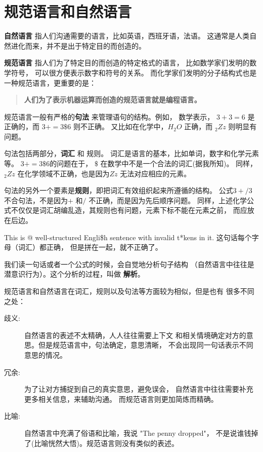\documentclass[10pt]{book}
\begin{document}
\section{规范语言和自然语言}

{\bf 自然语言} 指人们沟通需要的语言，比如英语，西班牙语，法语。
这通常是人类自然进化而来，并不是出于特定目的而创造的。


{\bf 规范语言} 指人们为了特定目的而创造的特定格式的语言，
比如数学家们发明的数学符号，
可以很方便表示数字和符号的关系。
而化学家们发明的分子结构式也是一种规范语言，更重要的是：

\begin{quote}
{\bf 人们为了表示机器运算而创造的规范语言就是编程语言。}
\end{quote}

规范语言一般有严格的{\bf 句法} 来管理语句的结构。例如，
数学表示， $3 + 3 = 6$  是正确的，而 $3 + = 3 \$ 6$ 则不正确。
又比如在化学中，$H_2O$ 正确，而 $_2Zz$ 则明显有问题。

句法包括两部分，{\bf 词汇} 和 规则。
词汇是语言的基本，比如单词，数字和化学元素等。
$3 += 3 \$ 6$的问题在于， \(\$\) 在数学中不是一个合法的词汇(据我所知)。
同样，$_2Zz$ 在化学领域不正确，也是因为$Zz$ 无法对应相应的元素。

句法的另外一个要素是{\bf 规则}，即把词汇有效组织起来所遵循的结构。
公式$3 +/ 3$ 不合句法，不是因为$+$ 和$/$ 不正确，而是因为先后顺序问题。
同样，上述化学公式不仅仅是词汇胡编乱造，其规则也有问题，元素下标不能在元素之前，
而应放在后边。

This is @ well-structured Engli\$h
sentence with invalid t*kens in it.  这句话每个字母（词汇）都正确，
但是拼在一起，就不正确了。

我们读一句话或者一个公式的时候，会自觉地分析句子结构
（自然语言中往往是潜意识行为）。这个分析的过程，叫做 {\bf 解析}。

规范语言和自然语言在词汇，规则以及句法等方面较为相似，但是也有
很多不同之处：

\begin{description}

\item[歧义:] 自然语言的表述不太精确，人人往往需要上下文
和相关情境确定对方的意思。但是规范语言中，句法确定，意思清晰，
不会出现同一句话表示不同意思的情况。

\item[冗余:] 为了让对方捕捉到自己的真实意思，避免误会，
自然语言中往往需要补充更多相关信息，来辅助沟通。
而规范语言则更加简炼而精确。

\item[比喻:] 自然语言中充满了俗语和比喻，我说 "The penny dropped"， 
不是说谁钱掉了(比喻恍然大悟)。规范语言则没有类似的表述。

\end{description}
\end{document}
